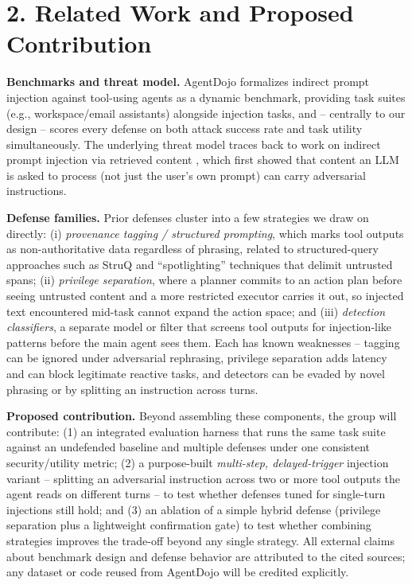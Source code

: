 \documentclass[11pt]{article}
\begin{document}
\section*{2. Related Work and Proposed Contribution}

\textbf{Benchmarks and threat model.} AgentDojo \cite{debenedetti2024agentdojo}
formalizes indirect prompt injection against tool-using agents as a dynamic
benchmark, providing task suites (e.g., workspace/email assistants) alongside
injection tasks, and -- centrally to our design -- scores every defense on
both attack success rate and task utility simultaneously. The underlying
threat model traces back to work on indirect prompt injection via retrieved
content \cite{greshake2023youve}, which first showed that content an LLM is
asked to process (not just the user's own prompt) can carry adversarial
instructions.

\textbf{Defense families.} Prior defenses cluster into a few strategies we
draw on directly: (i) \emph{provenance tagging / structured prompting}, which
marks tool outputs as non-authoritative data regardless of phrasing, related
to structured-query approaches such as StruQ \cite{chen2024struq} and
``spotlighting'' techniques that delimit untrusted spans; (ii) \emph{privilege
separation}, where a planner commits to an action plan before seeing untrusted
content and a more restricted executor carries it out, so injected text
encountered mid-task cannot expand the action space; and (iii) \emph{detection
classifiers}, a separate model or filter that screens tool outputs for
injection-like patterns before the main agent sees them. Each has known
weaknesses -- tagging can be ignored under adversarial rephrasing, privilege
separation adds latency and can block legitimate reactive tasks, and detectors
can be evaded by novel phrasing or by splitting an instruction across turns.

\textbf{Proposed contribution.} Beyond assembling these components, the group
will contribute: (1) an integrated evaluation harness that runs the same task
suite against an undefended baseline and multiple defenses under one
consistent security/utility metric; (2) a purpose-built \emph{multi-step,
delayed-trigger} injection variant -- splitting an adversarial instruction
across two or more tool outputs the agent reads on different turns -- to test
whether defenses tuned for single-turn injections still hold; and (3) an
ablation of a simple hybrid defense (privilege separation plus a lightweight
confirmation gate) to test whether combining strategies improves the
trade-off beyond any single strategy. All external claims about benchmark
design and defense behavior are attributed to the cited sources; any dataset
or code reused from AgentDojo will be credited explicitly.
\end{document}
